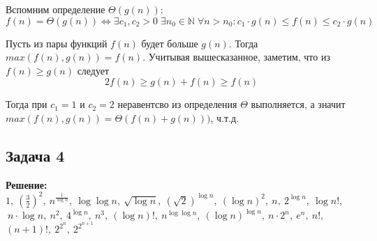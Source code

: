 \documentclass{article}
\begin{document}
	Вспомним определение $\Theta(g(n))$:
	$$ f(n) = \Theta(g(n)) \Leftrightarrow \exists c_1, c_2 > 0 \; \exists n_0 \in \mathds{N} \; \forall n > n_0: c_1\cdot g(n) \leq f(n) \leq c_2\cdot g(n)$$
	
	Пусть из пары функций $f(n)$ будет больше $g(n)$. Тогда $max(f(n), g(n)) = f(n)$. Учитывая вышесказанное, заметим, что из $f(n) \geq g(n)$ следует $$2f(n) \geq g(n) + f(n) \geq f(n)$$
	
	Тогда при $c_1 = 1$ и $c_2 = 2$ неравентсво из определения $\Theta$ выполняется, а значит $max(f(n), g(n)) = \Theta(f(n) + g(n)))$, ч.т.д.


	\subsection*{Задача 4}
	\textbf{Решение:} \\
	
	$1, \ (\frac{3}{2})^2, \ n^{\frac{1}{\log n}} , \ \log \log n,  \ \sqrt{\log n}, \ (\sqrt{2})^{\log n}, \ (\log n)^2, \ 	n, \ 2^{\log n} , \ \log n!, $\\
	$\ n \cdot \log n, \ n^2,\ 4^{\log n}, \ n^3, \ (\log n)!, \ n^{\log \log n}, \ (\log n)^{\log n}, \ n\cdot 2^n, \ e^n, \ n!,$
	$(n + 1)!, \ 2^{2^n}, \ 2^{2^{n + 1}}$
	
	
\end{document}
